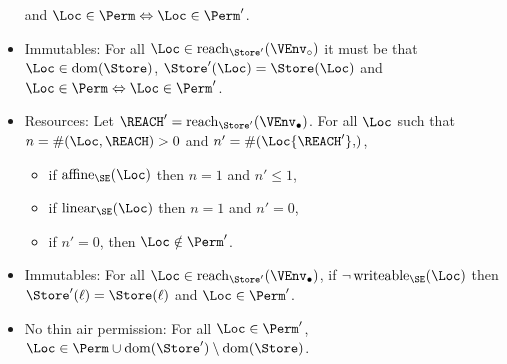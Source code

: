 \begin{theorem}
\begin{itemize}
    and $\Loc\in\Perm \Leftrightarrow \Loc\in\Perm'$.
  \item Immutables: For all $\Loc \in
    \Reach{\Store'}{\ImmutableBorrows\VEnv}$ it must be that
    $\Loc\in\Dom\Store$, 
    $\Store' (\Loc) = \Store (\Loc)$
    and $\Loc\in\Perm \Leftrightarrow \Loc\in\Perm'$.
  \item Resources:
    Let $\REACH' =\Reach{\Store'}{\Active\VEnv}$.
    For all $\Loc$ such that $n= \MultiNumber\Loc\REACH >0$ and $n' =
    \MultiNumber\Loc{\REACH'}$, 
    \begin{itemize}
    \item if $\Affine{\SE}\Loc$ then $n=1$ and $n'\le 1$,
    \item if $\Linear{\SE}\Loc$ then $n=1$ and $n' = 0$,
    \item if $n'=0$, then $\Loc\notin\Perm'$.
    \end{itemize}
  \item Immutables: For all $\Loc \in \Reach
    {\Store'}{\Active\VEnv}$, if $\neg\Writeable{\SE}\Loc$ then
    $\Store' (\ell) = \Store (\ell)$ and $\Loc\in \Perm'$.
  \item No thin air permission: For all $\Loc\in \Perm'$, $\Loc
    \in \Perm \cup  \Dom{\Store'} \setminus \Dom{\Store}$.
  \end{itemize}
\end{theorem}

